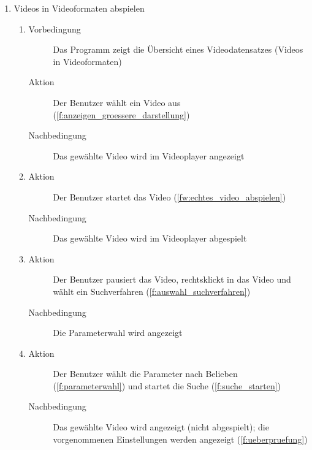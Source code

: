 \begin{enumerate} [label=\bfseries /TSW \arabic*0/, leftmargin=*]
	\item Videos in Videoformaten abspielen \label{ts:echtes_video_abspielen}
	\begin{enumerate}[leftmargin=0pt]
		\item
		\begin{description}
			\item[Vorbedingung] Das Programm zeigt die Übersicht eines Videodatensatzes (Videos in Videoformaten)
			\item[Aktion] Der Benutzer wählt ein Video aus (\ref{f:anzeigen_groessere_darstellung})
			\item[Nachbedingung] Das gewählte Video wird im Videoplayer angezeigt
		\end{description}
		\item
		\begin{description}
			\item[Aktion] Der Benutzer startet das Video (\ref{fw:echtes_video_abspielen})
			\item[Nachbedingung] Das gewählte Video wird im Videoplayer abgespielt
		\end{description}
		\item
		\begin{description}
			\item[Aktion] Der Benutzer pausiert das Video, rechtsklickt in das Video und wählt ein \gls{Suchverfahren} (\ref{f:auswahl_suchverfahren})
			\item[Nachbedingung] Die Parameterwahl wird angezeigt
		\end{description}
		\item
		\begin{description}
			\item[Aktion] Der Benutzer wählt die Parameter nach Belieben (\ref{f:parameterwahl}) und startet die Suche (\ref{f:suche_starten})
			\item[Nachbedingung] Das gewählte Video wird angezeigt (nicht abgespielt); die vorgenommenen Einstellungen werden angezeigt (\ref{f:ueberpruefung})
		\end{description}
	\end{enumerate}


\end{enumerate}
